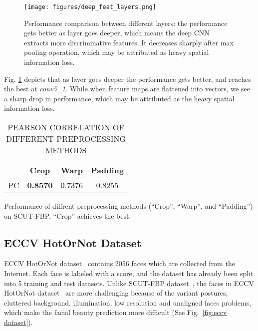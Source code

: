 \documentclass[a4paper,conference]{IEEEtran}
\begin{document}
  \begin{figure}[!htb]
    \centering
    \texttt{[image: figures/deep\_feat\_layers.png]}
    \caption{Performance comparison between different layers: the performance
    gets better as layer goes deeper, which means the deep CNN extracts more
    discriminative features. It decreases sharply after max pooling operation,
    which may be attributed as heavy spatial information loss.}
    \label{deep feature comparison}
  \end{figure}

  Fig. \ref{deep feature comparison} depicts that as layer goes deeper
  the performance gets better, and reaches the best at \emph{conv5\_1}.
  While when feature maps are flattened into vectors, we see a sharp drop
  in performance, which may be attributed as the heavy spatial information loss.


  \begin{table}[!htb]
    \caption{PEARSON CORRELATION OF DIFFERENT PREPROCESSING METHODS}
    \label{pc of diffrent preprocessing}
    \begin{center}
      \begin{tabular}{ l | c c c }
      \hline
        & \textbf{Crop} & \textbf{Warp} & \textbf{Padding} \\ \hline\hline
      PC & \textbf{0.8570} & 0.7376 & 0.8255\\
      \hline
      \end{tabular}
      \begin{tablenotes}
        \footnotesize
        Performance of diffrent preprocessing methods
        (``Crop'', ``Warp'', and ``Padding'') on SCUT-FBP.
        ``Crop'' achieves the best.
      \end{tablenotes}
    \end{center}
  \end{table}


  \subsection{ECCV HotOrNot Dataset}
    ECCV HotOrNot dataset~\cite{gray2010predicting} contains 2056 faces which
    are collected from the Internet. Each face is labeled with a score, and
    the dataset has already been split into 5 training and test datasets.
    Unlike SCUT-FBP dataset~\cite{xie2015scut}, the faces in ECCV HotOrNot
    dataset~\cite{gray2010predicting} are more challenging because of the variant
    postures, cluttered background, illumination, low resolution and unaligned
    faces problems, which make the facial beauty prediction more difficult
    (See Fig.~\ref{fig:eccv dataset}).
\end{document}
